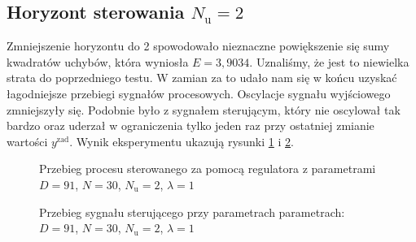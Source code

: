 \subsection{Horyzont sterowania $N_{\mathrm{u}} = 2$}
Zmniejszenie horyzontu do 2 spowodowało nieznaczne powiększenie się sumy kwadratów uchybów, która wyniosła $E = 3,9034$. Uznaliśmy, że jest to niewielka strata do poprzedniego testu. W zamian za to udało nam się w końcu uzyskać łagodniejsze przebiegi sygnałów procesowych. Oscylacje sygnału wyjściowego zmniejszyły się. Podobnie było z sygnałem sterującym, który nie oscylował tak bardzo oraz uderzał w ograniczenia tylko jeden raz przy ostatniej zmianie wartości $y^{\mathrm{zad}}$. Wynik eksperymentu ukazują rysunki \ref{dmc_Nu_2_y} i \ref{dmc_Nu_2_u}.
\\  
\begin{figure}[b]
    \centering
    \caption{Przebieg procesu sterowanego za pomocą regulatora z parametrami $D = 91$, $N = 30$, $N_{\mathrm{u}} = 2$, $\lambda = 1$}
    \label{dmc_Nu_2_y}
\end{figure}

\begin{figure}[b]
    \centering
    \caption{Przebieg sygnału sterującego przy parametrach parametrach: $D = 91$, $N = 30$, $N_{\mathrm{u}} = 2$, $\lambda = 1$}
    \label{dmc_Nu_2_u}
\end{figure}

